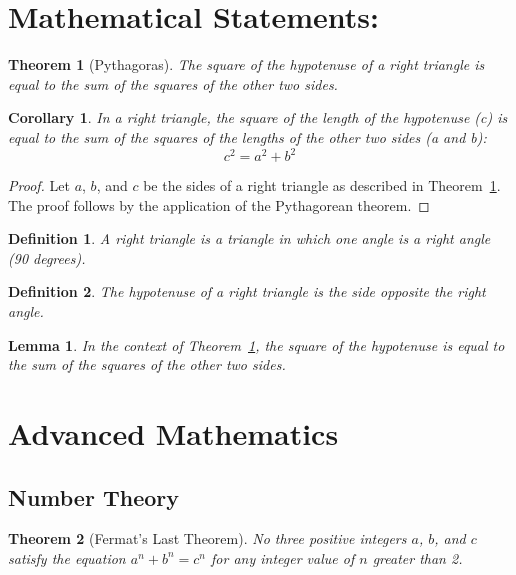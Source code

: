 \documentclass{article}
\newtheorem{theorem}{\textbf{Theorem}}
\newtheorem{definition}{\textbf{Definition}}
\newtheorem{lemma}{\textbf{Lemma}}
\newtheorem{corollary}{\textbf{Corollary}}[theorem]
\begin{document}
\section{Mathematical Statements:}

\begin{theorem}[Pythagoras]\label{pythagoras}
    The square of the hypotenuse of a right triangle is equal to the sum of the squares of the other two sides.
\end{theorem}

\begin{corollary}
    In a right triangle, the square of the length of the hypotenuse (c) is equal to the sum of the squares of the lengths of the other two sides (a and b):
    \[ c^2 = a^2 + b^2 \]
\end{corollary}

\begin{proof}
    Let \(a\), \(b\), and \(c\) be the sides of a right triangle as described in Theorem~\ref{pythagoras}. The proof follows by the application of the Pythagorean theorem.
\end{proof}

\begin{definition}
    A right triangle is a triangle in which one angle is a right angle (90 degrees).
\end{definition}

\begin{definition}
    The hypotenuse of a right triangle is the side opposite the right angle.
\end{definition}

\begin{lemma}
    In the context of Theorem~\ref{pythagoras}, the square of the hypotenuse is equal to the sum of the squares of the other two sides.
\end{lemma}

\section{Advanced Mathematics}

\subsection{Number Theory}

\begin{theorem}[Fermat's Last Theorem]\label{fermat}
    No three positive integers \(a\), \(b\), and \(c\) satisfy the equation \(a^n + b^n = c^n\) for any integer value of \(n\) greater than 2.
\end{theorem}
\end{document}
